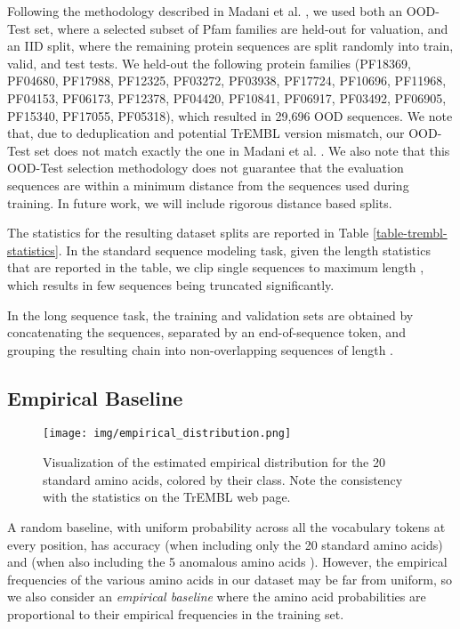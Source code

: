 Following the methodology described in Madani et al. \citep{progen}, we used both an OOD-Test set, where a selected subset of Pfam families are held-out for valuation, and an IID split, where the remaining protein sequences are split randomly into train, valid, and test tests. We held-out the following protein families (PF18369, PF04680, PF17988, PF12325, PF03272, PF03938, PF17724, PF10696, PF11968, PF04153, PF06173, PF12378, PF04420, PF10841, PF06917, PF03492, PF06905, PF15340, PF17055, PF05318), which resulted in 29,696 OOD sequences. We note that, due to deduplication and potential TrEMBL version mismatch, our OOD-Test set does not match exactly the one in Madani et al. \citep{progen}. We also note that this OOD-Test selection methodology does not guarantee that the evaluation sequences are within a minimum distance from the sequences used during training. In future work, we will include rigorous distance based splits.

The statistics for the resulting dataset splits are reported in Table \ref{table-trembl-statistics}. In the standard sequence modeling task, given the length statistics that are reported in the table, we clip single sequences to maximum length , which results in few sequences being truncated significantly.

In the long sequence task, the training and validation sets are obtained by concatenating the sequences, separated by an end-of-sequence token, and grouping the resulting chain into non-overlapping sequences of length .



\subsection{Empirical Baseline}

\begin{figure}[h]
  \centering
  \texttt{[image: img/empirical\_distribution.png]}
  \caption{\small{Visualization of the estimated empirical distribution for the 20 standard amino acids, colored by their class. Note the consistency with the statistics on the TrEMBL web page.}}
  \vspace{2mm}
  \label{figure-empirical-baseline}
\end{figure}

A random baseline, with uniform probability across all the vocabulary tokens at every position, has accuracy  (when including only the 20 standard amino acids) and  (when also including the 5 anomalous amino acids \citep{uniprot2019uniprot}). However, the empirical frequencies of the various amino acids in our dataset may be far from uniform, so we also consider an \textit{empirical baseline} where the amino acid probabilities are proportional to their empirical frequencies in the training set.

